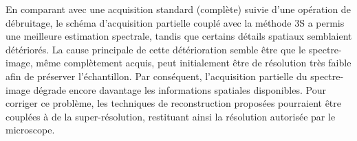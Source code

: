 En comparant avec une acquisition standard (complète) suivie d'une opération de débruitage, le schéma d'acquisition partielle couplé avec la méthode 3S a permis une meilleure estimation spectrale, tandis que certains détails spatiaux semblaient détériorés. 
%
La cause principale de cette détérioration semble être que le spectre-image, même complètement acquis, peut initialement être de résolution très faible afin de préserver l'échantillon. Par conséquent, l'acquisition partielle du spectre-image dégrade encore davantage les informations spatiales disponibles. Pour corriger ce problème, les techniques de reconstruction proposées pourraient être couplées à de la super-résolution, restituant ainsi la résolution autorisée par le microscope.

